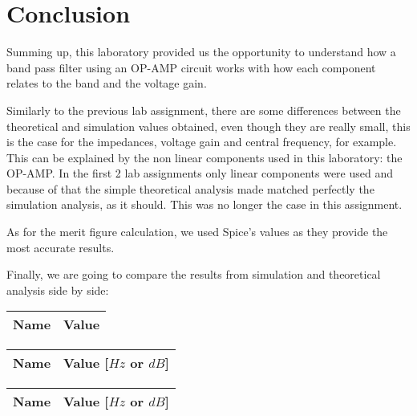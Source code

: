 \section{Conclusion}
\label{sec:conclusion}

Summing up, this laboratory provided us the opportunity to understand how a band pass filter using an OP-AMP circuit works with how each component relates to the band and the voltage gain.\par
Similarly to the previous lab assignment, there are some differences between the theoretical and simulation values obtained, even though they are really small, this is the case for the impedances, voltage gain and central frequency, for example. This can be explained by the non linear components used in this laboratory: the OP-AMP. In the first 2 lab assignments only linear components were used and because of that the simple theoretical analysis made matched perfectly the simulation analysis, as it should. This was no longer the case in this assignment. \par
As for the merit figure calculation, we used Spice's values as they provide the most accurate results. \par
Finally, we are going to compare the results from simulation and theoretical analysis side by side: \par

\begin{center}
  \begin{tabular}{ | c | c | }
    \hline    
    {\bf Name} & {\bf Value} \\ \hline
    
  \end{tabular}
\end{center}

\begin{center}
  \begin{tabular}{ | c | c | }
    \hline    
    {\bf Name} & {\bf Value [$Hz$ or $dB$]} \\ \hline
    
    \hline
  \end{tabular}
\end{center}

\begin{center}
  \begin{tabular}{ | c | c | }
    \hline    
    {\bf Name} & {\bf Value [$Hz$ or $dB$]} \\ \hline
    
    \hline
  \end{tabular}
\end{center}

